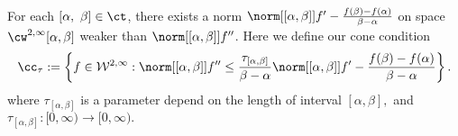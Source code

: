 \documentclass[]{elsarticle}
\theoremstyle{definition}
\theoremstyle{remark}
\newcommand{\FYnorm}[1]{\abs{#1}_{\cf_\cy}}
\newcommand{\GYnorm}[1]{\abs{#1}_{\cg_\cy}}
\begin{document}
For each $[\alpha, \ \beta] \in \ct$, there exists a norm $\norm[{[\alpha, \beta]}]{f'-\frac{f(\beta)-f(\alpha)}{\beta-\alpha}}$ on space 
$\cw^{2,\infty}[\alpha,\beta]$ weaker than $\norm[{[\alpha, \beta]}]{f''}$.
Here we define our cone condition
%
%
%
%
%
\begin{equation} \label{coneappxdef}
\cc_{\tau}:=\left\{f \in  \mathcal{W}^{2,\infty} : \norm[{[\alpha, \beta]}]{f''}\leq \frac{\tau_{[\alpha,\beta]}}{\beta-\alpha} \norm[{[\alpha, \beta]}]{f'-\frac{f(\beta)-f(\alpha)}{\beta-\alpha}}\right\}.
\end{equation}
where $\tau_{[\alpha,\beta]}$ is a parameter depend on the length of interval $[\alpha,\beta],$ and $\tau_{[\alpha,\beta]}: [0, \infty) \rightarrow [0, \infty).$
\end{document}
